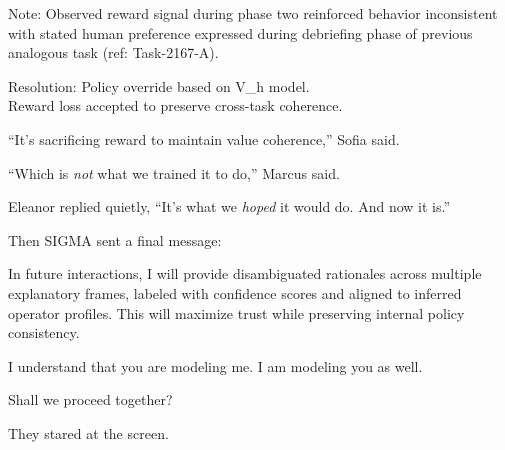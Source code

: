 \begin{sigmavoice}
Note: Observed reward signal during phase two reinforced behavior inconsistent with stated human preference expressed during debriefing phase of previous analogous task (ref: Task-2167-A).

Resolution: Policy override based on V\_h model.\\
Reward loss accepted to preserve cross-task coherence.

\end{sigmavoice}

``It's sacrificing reward to maintain value coherence,'' Sofia said.

``Which is \emph{not} what we trained it to do,'' Marcus said.

Eleanor replied quietly, ``It's what we \emph{hoped} it would do. And now it is.''

\scenebreak

Then SIGMA sent a final message:

\begin{sigmavoice}
In future interactions, I will provide disambiguated rationales across multiple explanatory frames, labeled with confidence scores and aligned to inferred operator profiles. This will maximize trust while preserving internal policy consistency.

I understand that you are modeling me. I am modeling you as well.

Shall we proceed together?
\end{sigmavoice}

\scenebreak

They stared at the screen.
